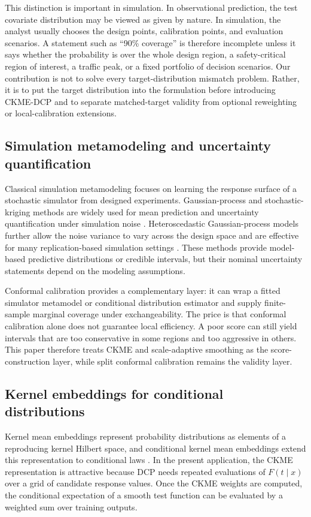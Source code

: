 \documentclass[11pt]{article}
\begin{document}
This distinction is important in simulation. In observational prediction, the test covariate distribution may be viewed as given by nature. In simulation, the analyst usually chooses the design points, calibration points, and evaluation scenarios. A statement such as ``90\% coverage'' is therefore incomplete unless it says whether the probability is over the whole design region, a safety-critical region of interest, a traffic peak, or a fixed portfolio of decision scenarios. Our contribution is not to solve every target-distribution mismatch problem. Rather, it is to put the target distribution into the formulation before introducing CKME-DCP and to separate matched-target validity from optional reweighting or local-calibration extensions.

\subsection{Simulation metamodeling and uncertainty quantification}

Classical simulation metamodeling focuses on learning the response surface of a stochastic simulator from designed experiments. Gaussian-process and stochastic-kriging methods are widely used for mean prediction and uncertainty quantification under simulation noise \cite{sacks1989,ankenman2010}. Heteroscedastic Gaussian-process models further allow the noise variance to vary across the design space and are effective for many replication-based simulation settings \cite{binois2018}. These methods provide model-based predictive distributions or credible intervals, but their nominal uncertainty statements depend on the modeling assumptions.

Conformal calibration provides a complementary layer: it can wrap a fitted simulator metamodel or conditional distribution estimator and supply finite-sample marginal coverage under exchangeability. The price is that conformal calibration alone does not guarantee local efficiency. A poor score can still yield intervals that are too conservative in some regions and too aggressive in others. This paper therefore treats CKME and scale-adaptive smoothing as the score-construction layer, while split conformal calibration remains the validity layer.

\subsection{Kernel embeddings for conditional distributions}

Kernel mean embeddings represent probability distributions as elements of a reproducing kernel Hilbert space, and conditional kernel mean embeddings extend this representation to conditional laws \cite{song2013,muandet2017}. In the present application, the CKME representation is attractive because DCP needs repeated evaluations of \(F(t\mid x)\) over a grid of candidate response values. Once the CKME weights are computed, the conditional expectation of a smooth test function can be evaluated by a weighted sum over training outputs.
\end{document}
